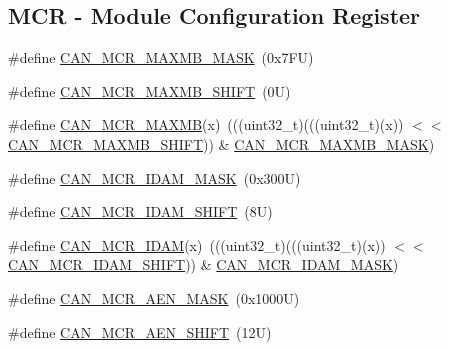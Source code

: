 \subsection*{M\+CR -\/ Module Configuration Register}
\begin{DoxyCompactItemize}
\item 
\#define \mbox{\hyperlink{group___c_a_n___register___masks_ga86b59c74c0b9f310c3922c7c8c04dd03}{C\+A\+N\+\_\+\+M\+C\+R\+\_\+\+M\+A\+X\+M\+B\+\_\+\+M\+A\+SK}}~(0x7\+F\+U)
\item 
\#define \mbox{\hyperlink{group___c_a_n___register___masks_ga0807275385d5041baeca3bb7ddb4bdf5}{C\+A\+N\+\_\+\+M\+C\+R\+\_\+\+M\+A\+X\+M\+B\+\_\+\+S\+H\+I\+FT}}~(0\+U)
\item 
\#define \mbox{\hyperlink{group___c_a_n___register___masks_ga3b4797e2f712a545396f339653929457}{C\+A\+N\+\_\+\+M\+C\+R\+\_\+\+M\+A\+X\+MB}}(x)~(((uint32\+\_\+t)(((uint32\+\_\+t)(x)) $<$$<$ \mbox{\hyperlink{group___c_a_n___register___masks_ga0807275385d5041baeca3bb7ddb4bdf5}{C\+A\+N\+\_\+\+M\+C\+R\+\_\+\+M\+A\+X\+M\+B\+\_\+\+S\+H\+I\+FT}})) \& \mbox{\hyperlink{group___c_a_n___register___masks_ga86b59c74c0b9f310c3922c7c8c04dd03}{C\+A\+N\+\_\+\+M\+C\+R\+\_\+\+M\+A\+X\+M\+B\+\_\+\+M\+A\+SK}})
\item 
\#define \mbox{\hyperlink{group___c_a_n___register___masks_ga758ccb033a3d823109f8bf4e23b46827}{C\+A\+N\+\_\+\+M\+C\+R\+\_\+\+I\+D\+A\+M\+\_\+\+M\+A\+SK}}~(0x300\+U)
\item 
\#define \mbox{\hyperlink{group___c_a_n___register___masks_gae76a75d680b0c33f41429f14132ee78f}{C\+A\+N\+\_\+\+M\+C\+R\+\_\+\+I\+D\+A\+M\+\_\+\+S\+H\+I\+FT}}~(8\+U)
\item 
\#define \mbox{\hyperlink{group___c_a_n___register___masks_ga864867bd7c0475f033af7efa7f021b07}{C\+A\+N\+\_\+\+M\+C\+R\+\_\+\+I\+D\+AM}}(x)~(((uint32\+\_\+t)(((uint32\+\_\+t)(x)) $<$$<$ \mbox{\hyperlink{group___c_a_n___register___masks_gae76a75d680b0c33f41429f14132ee78f}{C\+A\+N\+\_\+\+M\+C\+R\+\_\+\+I\+D\+A\+M\+\_\+\+S\+H\+I\+FT}})) \& \mbox{\hyperlink{group___c_a_n___register___masks_ga758ccb033a3d823109f8bf4e23b46827}{C\+A\+N\+\_\+\+M\+C\+R\+\_\+\+I\+D\+A\+M\+\_\+\+M\+A\+SK}})
\item 
\#define \mbox{\hyperlink{group___c_a_n___register___masks_gaf788111bd2bf9a69160d0a0cb713c926}{C\+A\+N\+\_\+\+M\+C\+R\+\_\+\+A\+E\+N\+\_\+\+M\+A\+SK}}~(0x1000\+U)
\item 
\#define \mbox{\hyperlink{group___c_a_n___register___masks_ga6c610bd65cb9471ad0ca511dbe2c86d4}{C\+A\+N\+\_\+\+M\+C\+R\+\_\+\+A\+E\+N\+\_\+\+S\+H\+I\+FT}}~(12\+U)

\end{DoxyCompactItemize}
